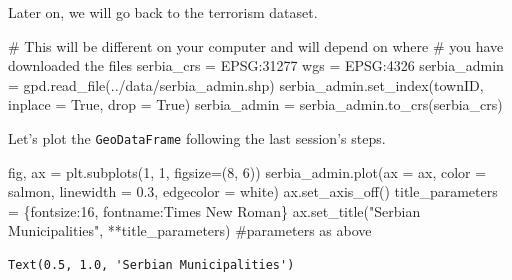 \documentclass[
  letterpaper,
  DIV=11,
  numbers=noendperiod]{scrreprt}
\newenvironment{Shaded}{\begin{snugshade}}{\end{snugshade}}
\newcommand{\CommentTok}[1]{\textcolor[rgb]{0.37,0.37,0.37}{#1}}
\newcommand{\DecValTok}[1]{\textcolor[rgb]{0.68,0.00,0.00}{#1}}
\newcommand{\FloatTok}[1]{\textcolor[rgb]{0.68,0.00,0.00}{#1}}
\newcommand{\NormalTok}[1]{\textcolor[rgb]{0.00,0.23,0.31}{#1}}
\newcommand{\OperatorTok}[1]{\textcolor[rgb]{0.37,0.37,0.37}{#1}}
\newcommand{\StringTok}[1]{\textcolor[rgb]{0.13,0.47,0.30}{#1}}
\newcommand{\VariableTok}[1]{\textcolor[rgb]{0.07,0.07,0.07}{#1}}
\begin{document}
Later on, we will go back to the terrorism dataset.

\begin{Shaded}
\begin{Highlighting}[]
\CommentTok{\# This will be different on your computer and will depend on where}
\CommentTok{\# you have downloaded the files}
\NormalTok{serbia\_crs }\OperatorTok{=} \StringTok{\textquotesingle{}EPSG:31277\textquotesingle{}}
\NormalTok{wgs }\OperatorTok{=} \StringTok{\textquotesingle{}EPSG:4326\textquotesingle{}}
\NormalTok{serbia\_admin }\OperatorTok{=}\NormalTok{ gpd.read\_file(}\StringTok{\textquotesingle{}../data/serbia\_admin.shp\textquotesingle{}}\NormalTok{)}
\NormalTok{serbia\_admin.set\_index(}\StringTok{\textquotesingle{}townID\textquotesingle{}}\NormalTok{, inplace }\OperatorTok{=} \VariableTok{True}\NormalTok{, drop }\OperatorTok{=} \VariableTok{True}\NormalTok{)}
\NormalTok{serbia\_admin }\OperatorTok{=}\NormalTok{ serbia\_admin.to\_crs(serbia\_crs)}
\end{Highlighting}
\end{Shaded}

Let's plot the \texttt{GeoDataFrame} following the last session's steps.

\begin{Shaded}
\begin{Highlighting}[]
\NormalTok{fig, ax }\OperatorTok{=}\NormalTok{ plt.subplots(}\DecValTok{1}\NormalTok{, }\DecValTok{1}\NormalTok{, figsize}\OperatorTok{=}\NormalTok{(}\DecValTok{8}\NormalTok{, }\DecValTok{6}\NormalTok{))}
\NormalTok{serbia\_admin.plot(ax }\OperatorTok{=}\NormalTok{ ax, color }\OperatorTok{=} \StringTok{\textquotesingle{}salmon\textquotesingle{}}\NormalTok{, linewidth }\OperatorTok{=} \FloatTok{0.3}\NormalTok{, edgecolor }\OperatorTok{=} \StringTok{\textquotesingle{}white\textquotesingle{}}\NormalTok{)}
\NormalTok{ax.set\_axis\_off()}
\NormalTok{title\_parameters }\OperatorTok{=}\NormalTok{ \{}\StringTok{\textquotesingle{}fontsize\textquotesingle{}}\NormalTok{:}\StringTok{\textquotesingle{}16\textquotesingle{}}\NormalTok{, }\StringTok{\textquotesingle{}fontname\textquotesingle{}}\NormalTok{:}\StringTok{\textquotesingle{}Times New Roman\textquotesingle{}}\NormalTok{\}}
\NormalTok{ax.set\_title(}\StringTok{"Serbian Municipalities"}\NormalTok{, }\OperatorTok{**}\NormalTok{title\_parameters) }\CommentTok{\#parameters as above}
\end{Highlighting}
\end{Shaded}

\begin{verbatim}
Text(0.5, 1.0, 'Serbian Municipalities')
\end{verbatim}
\end{document}
